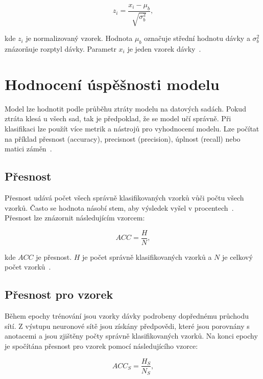 \documentclass[FM,BP]{tulthesis}
\begin{document}
\begin{equation}
\label{eqn:batch_mean}
z_i = \frac{x_i - \mu_b}{\sqrt{\sigma^2_b}},
\end{equation}

kde $ z_i $ je normalizovaný vzorek. Hodnota $ \mu_b $ označuje střední hodnotu dávky a $ \sigma^2_b $ znázorňuje rozptyl dávky. Parametr $ x_i $ je jeden vzorek dávky~\cite{burkov2019hundred}.

\section{Hodnocení úspěšnosti modelu} %
Model lze hodnotit podle průběhu ztráty modelu na datových sadách. Pokud ztráta klesá u všech sad, tak je předpoklad, že se model učí správně. Při klasifikaci lze použít více metrik a nástrojů pro vyhodnocení modelu. Lze počítat na příklad přesnost (accuracy), precisnost (precision), úplnost (recall) nebo matici záměn~\cite{burkov2019hundred}.

\subsection{Přesnost} %
Přesnost udává počet všech správně klasifikovaných vzorků vůči počtu všech vzorků. Často se hodnota násobí stem, aby výsledek vyšel v procentech~\cite{burkov2019hundred}. Přesnost lze znázornit následujícím vzorcem:

\begin{equation}
\label{eqn:accuracy}
ACC = \frac{H}{N},
\end{equation}

kde $ ACC $ je přesnost. $ H $ je počet správně klasifikovaných vzorků a $ N $ je celkový počet vzorků~\cite{burkov2019hundred}.

\subsection{Přesnost pro vzorek} %
Během epochy trénování jsou vzorky dávky podrobeny dopřednému průchodu sítí. Z výstupu neuronové sítě jsou získány předpovědi, které jsou porovnány s anotacemi a jsou zjištěny počty správně klasifikovaných vzorků. Na konci epochy je spočítána přesnost pro vzorek pomocí následujícího vzorce:

\begin{equation}
\label{eqn:accuracy_samples}
ACC_S = \frac{H_S}{N_S},
\end{equation}
\end{document}
